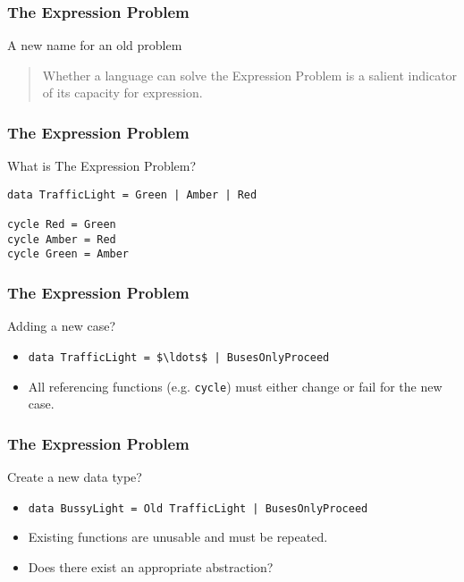 \begin{frame}
\frametitle{The Expression Problem}
\begin{block}{A new name for an old problem\cite{wadler1998expression}}
\begin{quote}
Whether a language can solve the Expression Problem is a salient
indicator of its capacity for expression.
\end{quote}
\end{block}
\end{frame}

\begin{frame}[fragile]
\frametitle{The Expression Problem}
\begin{block}{What is The Expression Problem?}
\begin{lstlisting}[style=haskell,mathescape]
data TrafficLight = Green | Amber | Red

cycle Red = Green
cycle Amber = Red
cycle Green = Amber
\end{lstlisting}
\end{block}
\end{frame}

\begin{frame}[fragile]
\frametitle{The Expression Problem}
\begin{block}{Adding a new case?}
\begin{itemize}
\item<1-> \lstinline[style=haskell,mathescape]{data TrafficLight = $\ldots$ | BusesOnlyProceed}
\item<2-> All referencing functions (e.g. \lstinline[style=haskell]{cycle}) must either change or fail for the new case.
\end{itemize}
\end{block}
\end{frame}

\begin{frame}[fragile]
\frametitle{The Expression Problem}
\begin{block}{Create a new data type?}
\begin{itemize}
\item<1-> \lstinline[style=haskell,mathescape]{data BussyLight = Old TrafficLight | BusesOnlyProceed}
\item<2-> Existing functions are unusable and must be repeated.
\item<3-> Does there exist an appropriate abstraction? 
\end{itemize}
\end{block}
\end{frame}

